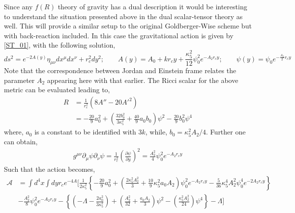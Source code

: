 \documentclass{article}
\begin{document}
Since any $f(R)$ theory of gravity has a dual description it would be interesting to understand the situation presented above in the dual scalar-tensor theory as well. This will provide a similar setup to the original Goldberger-Wise scheme but with back-reaction included. In this case the gravitational action is given by \ref{ST_01}, with the following solution,
\begin{equation}
ds^{2}=e^{-2A(y)}\eta _{\mu \nu}dx^{\mu}dx^{\nu}+r_{c}^{2}dy^{2};\qquad A(y)=A_{0}+kr_{c}y+\frac{\kappa _{5}^{2}}{12}\psi _{0}^{2}e^{-A_{2}r_{c}y};\qquad \psi (y)=\psi _{0}e^{-\frac{A_{2}}{2}r_{c}y}
\end{equation}
Note that the correspondence between Jordan and Einstein frame relates the parameter $A_{2}$ appearing here with that earlier. The Ricci scalar for the above metric can be evaluated leading to,
\begin{align}
R&=\frac{1}{r_{c}^{2}}\left(8A''-20A'^{2}\right)
\nonumber
\\
&=-\frac{20}{9}a_{0}^{2}+\left(\frac{32b_{0}^{2}}{3\kappa _{5}^{2}}+\frac{40}{9}a_{0}b_{0} \right)\psi ^{2}-\frac{20}{9}b_{0}^{2}\psi ^{4}
\end{align}
where, $a_{0}$ is a constant to be identified with $3k$, while, $b_{0}=\kappa _{5}^{2}A_{2}/4$. Further one can obtain,
\begin{align}
g^{\mu \nu}\partial _{\mu}\psi \partial _{\nu} \psi =\frac{1}{r_{c}^{2}}\left(\frac{\partial \psi}{\partial y}\right)^{2}
=\frac{A_{2}^{2}}{4}\psi _{0}^{2}e^{-A_{2}r_{c}y}
\end{align}
Such that the action becomes,
\begin{align}
\mathcal{A}&=\int d^{4}x\int dy r_{c}e^{-4A}\Bigg[\frac{1}{2\kappa _{5}^{2}}
\left\lbrace -\frac{20}{9}a_{0}^{2}+\left(\frac{2\kappa _{5}^{2}A_{2}^{2}}{3}+\frac{10}{9}\kappa _{5}^{2}a_{0}A_{2}\right)\psi _{0}^{2}e^{-A_{2}r_{c}y}-\frac{5}{36}\kappa _{5}^{4}A_{2}^{2}\psi _{0}^{4}e^{-2A_{2}r_{c}y} \right\rbrace
\nonumber
\\
&-\frac{A_{2}^{2}}{8}\psi _{0}^{2}e^{-A_{2}r_{c}y}
-\left\lbrace \left(-\Lambda-\frac{2a_{0}^{2}}{3\kappa _{5}^{2}}\right)
+\left(\frac{A_{2}^{2}}{32}+\frac{a_{0}A_{2}}{3} \right)\psi ^{2}-\left(\frac{\kappa _{5}^{2}A_{2}^{2}}{24}\right)\psi ^{4} \right\rbrace -\Lambda\Bigg]
\end{align}
\end{document}
